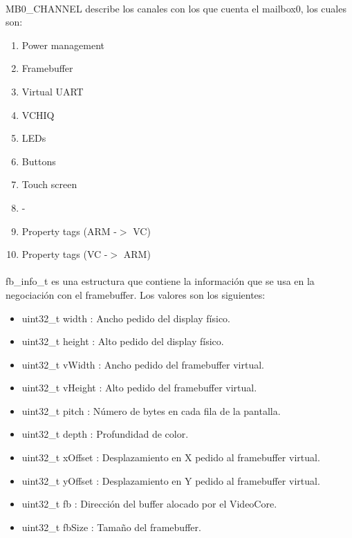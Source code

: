 \documentclass{article}
\begin{document}
\paragraph{}
MB0\_CHANNEL describe los canales con los que cuenta el mailbox0, los cuales son:

\begin{enumerate}
\item Power management
\item Framebuffer
\item Virtual UART
\item VCHIQ
\item LEDs
\item Buttons
\item Touch screen
\item -
\item Property tags (ARM -$>$ VC)
\item Property tags (VC -$>$ ARM) 
\end{enumerate}

\paragraph{}
fb\_info\_t es una estructura que contiene la informaci\'on que se usa en la negociaci\'on con el framebuffer. Los valores son los siguientes:\cite{Mailbox}

\begin{itemize}
\item uint32\_t width : Ancho pedido del display f\'isico.
\item uint32\_t height : Alto pedido del display f\'isico.
\item uint32\_t vWidth : Ancho pedido del framebuffer virtual.
\item uint32\_t vHeight : Alto pedido del framebuffer virtual.
\item uint32\_t pitch : N\'umero de bytes en cada fila de la pantalla.
\item uint32\_t depth : Profundidad de color.
\item uint32\_t xOffset : Desplazamiento en X pedido al framebuffer virtual.
\item uint32\_t yOffset : Desplazamiento en Y pedido al framebuffer virtual.
\item uint32\_t fb : Direcci\'on del buffer alocado por el VideoCore.
\item uint32\_t fbSize : Tama\~no del framebuffer.
\end{itemize}
\end{document}
